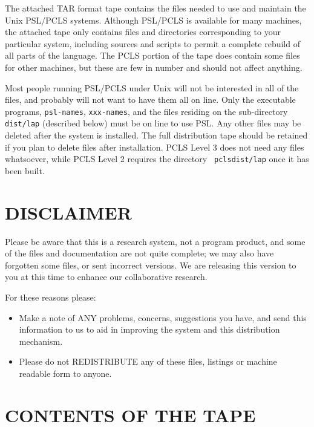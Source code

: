 The attached TAR format tape contains the files needed to use and
maintain the Unix PSL/PCLS systems.  Although PSL/PCLS is available for
many machines, the attached tape only contains files and directories
corresponding to your particular system, including sources and scripts
to permit a complete rebuild of all parts of the language.  The PCLS
portion of the tape does contain some files for other machines, but
these are few in number and should not affect anything.

Most people running PSL/PCLS under Unix will not be interested in all of
the files, and probably will not want to have them all on line.  Only
the executable programs, {\tt psl-names}, {\tt xxx-names}, and the
files residing on the
sub-directory {\tt dist/lap} (described below) must be on line to use
PSL.  Any other files may be deleted after the system is installed.
The full distribution tape should be retained if you plan to delete
files after installation.  PCLS Level 3 does not need any files
whatsoever, while PCLS Level 2 requires the directory {\tt
pclsdist/lap} once it has been built.

\section{DISCLAIMER}

Please be aware that this is a research system, not a program product,
and some of the files and documentation are not quite complete; we may
also have forgotten some files, or sent incorrect versions.  We are
releasing this version to you at this time to enhance our
collaborative research.

For these reasons please:

\begin{itemize}

\item Make a note of ANY problems, concerns, suggestions you have, and
send this information to us to aid in improving the system and this
distribution mechanism.

\item Please do not REDISTRIBUTE any of these files, listings or machine
readable form to anyone.

\end{itemize}

\section{CONTENTS OF THE TAPE}

